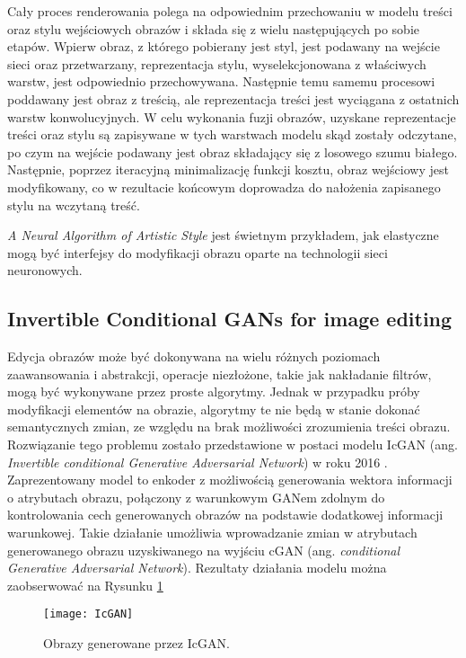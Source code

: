     Cały proces renderowania polega na odpowiednim przechowaniu w modelu treści
    oraz stylu wejściowych obrazów i składa się z wielu następujących po sobie etapów.
    Wpierw obraz, z którego pobierany jest styl, jest podawany na
    wejście sieci oraz przetwarzany, reprezentacja stylu, wyselekcjonowana z
    właściwych warstw, jest odpowiednio przechowywana. Następnie temu samemu
    procesowi poddawany jest obraz z treścią, ale reprezentacja treści jest wyciągana z ostatnich
    warstw konwolucyjnych.
    W celu wykonania fuzji obrazów, uzyskane reprezentacje treści oraz stylu są
    zapisywane w tych warstwach modelu skąd zostały odczytane, po czym na wejście
    podawany jest obraz składający się z losowego szumu białego.
    Następnie, poprzez iteracyjną minimalizację funkcji kosztu, obraz wejściowy jest modyfikowany, co w rezultacie końcowym doprowadza do nałożenia zapisanego
    stylu na wczytaną treść.

    \textit{A Neural Algorithm of Artistic Style} jest świetnym przykładem, jak elastyczne
    mogą być interfejsy do modyfikacji obrazu oparte na technologii sieci neuronowych.

  \subsection{Invertible Conditional GANs for image editing}
    Edycja obrazów może być dokonywana na wielu różnych poziomach zaawansowania
    i abstrakcji, operacje niezłożone, takie jak nakładanie filtrów, mogą być
    wykonywane przez proste algorytmy. Jednak w przypadku próby modyfikacji
    elementów na obrazie, algorytmy te nie będą w stanie dokonać semantycznych
    zmian, ze względu na brak możliwości zrozumienia treści obrazu. Rozwiązanie
    tego problemu zostało przedstawione w postaci modelu IcGAN
    (ang. \textit{Invertible conditional Generative Adversarial Network}) w roku 2016
    \cite{gan_editing}. Zaprezentowany model to enkoder z możliwością
    generowania wektora informacji o atrybutach obrazu, połączony z warunkowym
    GANem zdolnym do kontrolowania cech generowanych obrazów na podstawie dodatkowej
    informacji warunkowej. Takie działanie umożliwia wprowadzanie zmian w
    atrybutach generowanego obrazu uzyskiwanego na wyjściu cGAN (ang. \textit{conditional Generative
    Adversarial Network}). Rezultaty działania modelu można zaobserwować na
    Rysunku \ref{fig:IcGAN}

    \begin{figure}[ht]
      \centering
      \texttt{[image: IcGAN]}
      \caption[Obrazy generowane przez IcGAN - źródło: \cite{gan_editing}]{Obrazy generowane przez IcGAN.}
      \label{fig:IcGAN}
    \end{figure}

